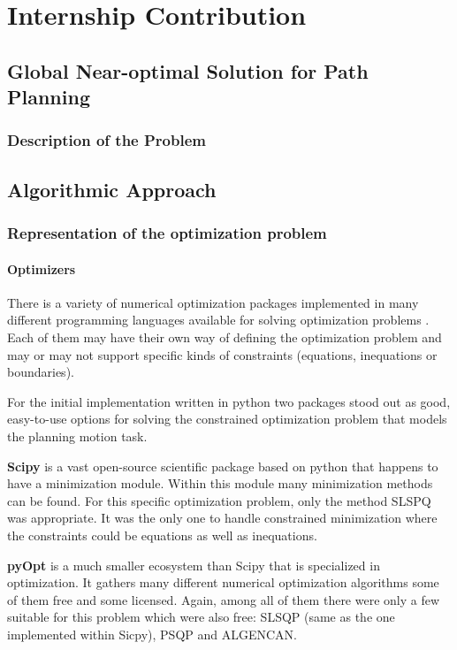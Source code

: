 \part{Internship Contribution}

\chapter{Global Near-optimal Solution for Path Planning}
\lipsum[1]
\section{Description of the Problem}

\chapter{Algorithmic Approach}
\lipsum[1]
\newpage
\section{Representation of the optimization problem}

\subsection{Optimizers}

There is a variety of numerical optimization packages implemented in many different programming languages available for solving optimization problems \cite{pyopt-paper}. Each of them may have their own way of defining the optimization problem and may or may not support specific kinds of constraints (equations, inequations or boundaries).

For the initial implementation written in python two packages stood out as good, easy-to-use options for solving the constrained optimization problem that models the planning motion task.

\textbf{Scipy} is a vast open-source scientific package based on python that happens to have a minimization module. Within this module many minimization methods can be found. For this specific optimization problem, only the method SLSPQ was appropriate. It was the only one to handle constrained minimization where the constraints could be equations as well as inequations.

\textbf{pyOpt} is a much smaller ecosystem than Scipy that is specialized in optimization. It gathers many different numerical optimization algorithms some of them free and some licensed. Again, among all of them there were only a few suitable for this problem which were also free: SLSQP (same as the one implemented within Sicpy), PSQP and ALGENCAN.

